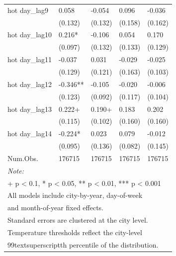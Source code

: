 \begin{table}
{\begin{tabular}[t]{lllll}
hot day_{lag9} & 0.058 & -0.054 & 0.096 & -0.036\\

 & (0.132) & (0.132) & (0.158) & (0.162)\\

hot day_{lag10} & 0.216* & -0.106 & 0.054 & 0.170\\

 & (0.097) & (0.132) & (0.133) & (0.129)\\

hot day_{lag11} & -0.037 & 0.031 & -0.029 & -0.025\\

 & (0.129) & (0.121) & (0.163) & (0.103)\\

hot day_{lag12} & -0.346** & -0.105 & -0.020 & -0.006\\

 & (0.123) & (0.092) & (0.117) & (0.104)\\

hot day_{lag13} & 0.222+ & 0.190+ & 0.183 & 0.202\\

 & (0.115) & (0.102) & (0.160) & (0.160)\\

hot day_{lag14} & -0.224* & 0.023 & 0.079 & -0.012\\

 & (0.095) & (0.136) & (0.082) & (0.145)\\

Num.Obs. & 176715 & 176715 & 176715 & 176715\\
\bottomrule
\multicolumn{5}{l}{\rule{0pt}{1em}\textit{Note: }}\\
\multicolumn{5}{l}{\rule{0pt}{1em}+ p < 0.1, * p < 0.05, ** p < 0.01, *** p < 0.001}\\
\multicolumn{5}{l}{\rule{0pt}{1em}All models include city-by-year, day-of-week}\\
\multicolumn{5}{l}{\rule{0pt}{1em}and month-of-year fixed effects.}\\
\multicolumn{5}{l}{\rule{0pt}{1em}Standard errors are clustered at the city level.}\\
\multicolumn{5}{l}{\rule{0pt}{1em}Temperature thresholds reflect the city-level}\\
\multicolumn{5}{l}{\rule{0pt}{1em}99textsuperscript{th} percentile of the distribution.}\\
\end{tabular}}
\end{table}
